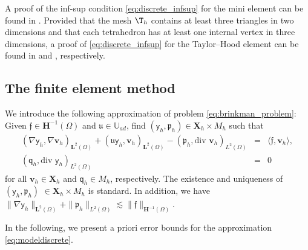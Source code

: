 \documentclass[final]{siamart0216}
\begin{document}
A proof of the inf-sup condition \eqref{eq:discrete_infsup} for the mini element can be found in \cite[Lemma 4.20]{Guermond-Ern}. Provided that the mesh $\T_h$ contains at least three triangles in two dimensions and that each tetrahedron has at least one internal vertex in three dimensions, a proof of \eqref{eq:discrete_infsup} for the Taylor--Hood element can be found in \cite[Theorem 8.8.1]{MR3097958} and \cite[Theorem 8.8.2]{MR3097958}, respectively.

\subsection{The finite element method}
We introduce the following approximation of problem \eqref{eq:brinkman_problem}: Given $\boldsymbol{\mathfrak{f}} \in \mathbf{H}^{-1}(\Omega)$ and $\mathfrak{u} \in \mathbb{U}_{ad}$, find $(\boldsymbol{\mathsf{y}}_{h},\mathfrak{p}_{h})\in \mathbf{X}_h\times M_h$ such that
\begin{equation}\label{eq:modeldiscrete}
\begin{array}{rcl}
(\nabla \boldsymbol{\mathsf{y}}_{h},\nabla \mathbf{v}_{h})_{\mathbf{L}^2(\Omega)}\!+\!( \mathfrak{u}\boldsymbol{\mathsf{y}}_{h}, \mathbf{v}_{h})_{\mathbf{L}^2(\Omega)}\!-\!(\mathfrak{p}_{h},\text{div }\mathbf{v}_{h})_{L^2(\Omega)}& = & \langle \boldsymbol{\mathfrak{f}},\mathbf{v}_{h} \rangle,\\
(\mathsf{q}_{h},\text{div }\boldsymbol{\mathsf{y}}_{h})_{L^2(\Omega)} & = & 0
\end{array}
\end{equation}
for all $\mathbf{v}_{h}\in \mathbf{X}_h$ and $\mathsf{q}_{h}\in M_h$, respectively. The existence and uniqueness of $(\boldsymbol{\mathsf{y}}_{h},\mathfrak{p}_{h})$ $\in \mathbf{X}_h\times M_h$ is standard. In addition, we have $\|\nabla \boldsymbol{\mathsf{y}}_{h}\|_{\mathbf{L}^2(\Omega)} + \|\mathfrak{p}_{h}\|_{L^2(\Omega)}\lesssim \| \boldsymbol{\mathfrak{f}}\|_{\mathbf{H}^{-1}(\Omega)}$.

In the following, we present a priori error bounds for the approximation \eqref{eq:modeldiscrete}.
\end{document}
